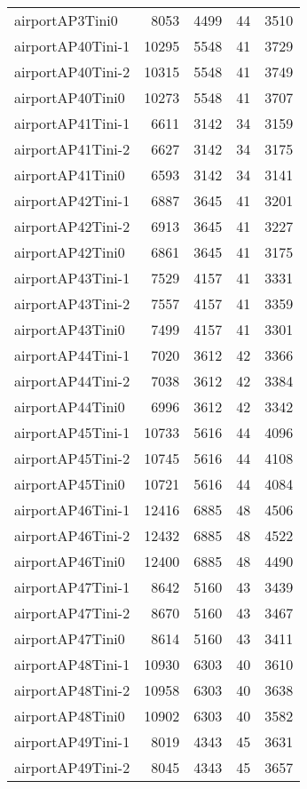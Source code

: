 \documentclass[../../../thesis.tex]{subfiles}
\begin{document}
\begin{longtable}{lrrrr}
airportAP3Tini0 & 8053 & 4499 & 44 & 3510 \\
airportAP40Tini-1 & 10295 & 5548 & 41 & 3729 \\
airportAP40Tini-2 & 10315 & 5548 & 41 & 3749 \\
airportAP40Tini0 & 10273 & 5548 & 41 & 3707 \\
airportAP41Tini-1 & 6611 & 3142 & 34 & 3159 \\
airportAP41Tini-2 & 6627 & 3142 & 34 & 3175 \\
airportAP41Tini0 & 6593 & 3142 & 34 & 3141 \\
airportAP42Tini-1 & 6887 & 3645 & 41 & 3201 \\
airportAP42Tini-2 & 6913 & 3645 & 41 & 3227 \\
airportAP42Tini0 & 6861 & 3645 & 41 & 3175 \\
airportAP43Tini-1 & 7529 & 4157 & 41 & 3331 \\
airportAP43Tini-2 & 7557 & 4157 & 41 & 3359 \\
airportAP43Tini0 & 7499 & 4157 & 41 & 3301 \\
airportAP44Tini-1 & 7020 & 3612 & 42 & 3366 \\
airportAP44Tini-2 & 7038 & 3612 & 42 & 3384 \\
airportAP44Tini0 & 6996 & 3612 & 42 & 3342 \\
airportAP45Tini-1 & 10733 & 5616 & 44 & 4096 \\
airportAP45Tini-2 & 10745 & 5616 & 44 & 4108 \\
airportAP45Tini0 & 10721 & 5616 & 44 & 4084 \\
airportAP46Tini-1 & 12416 & 6885 & 48 & 4506 \\
airportAP46Tini-2 & 12432 & 6885 & 48 & 4522 \\
airportAP46Tini0 & 12400 & 6885 & 48 & 4490 \\
airportAP47Tini-1 & 8642 & 5160 & 43 & 3439 \\
airportAP47Tini-2 & 8670 & 5160 & 43 & 3467 \\
airportAP47Tini0 & 8614 & 5160 & 43 & 3411 \\
airportAP48Tini-1 & 10930 & 6303 & 40 & 3610 \\
airportAP48Tini-2 & 10958 & 6303 & 40 & 3638 \\
airportAP48Tini0 & 10902 & 6303 & 40 & 3582 \\
airportAP49Tini-1 & 8019 & 4343 & 45 & 3631 \\
airportAP49Tini-2 & 8045 & 4343 & 45 & 3657 \\

\end{longtable}
\end{document}
